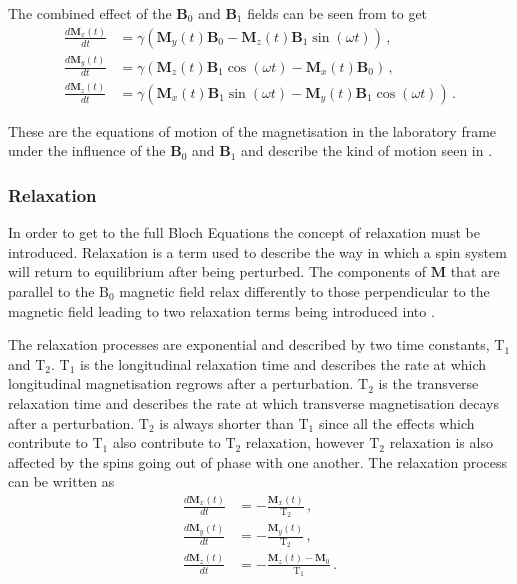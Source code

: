 The combined effect of the $\mathbf{B}_0$ and $\mathbf{B}_1$ fields can be seen from  to get \cite{DeGraaf2007}
\begin{align}
	\frac{d\mathbf{M}_x(t)}{dt} &= \gamma \left(\mathbf{M}_y(t)\mathbf{B}_0 - \mathbf{M}_z(t)\mathbf{B}_1\sin(\omega t)\right)\,,\label{eq:bloch_norelx}\\
	\frac{d\mathbf{M}_y(t)}{dt} &= \gamma \left(\mathbf{M}_z(t)\mathbf{B}_1\cos(\omega t) - \mathbf{M}_x(t)\mathbf{B}_0\right)\,,\label{eq:bloch_norely}\\
	\frac{d\mathbf{M}_z(t)}{dt} &= \gamma \left(\mathbf{M}_x(t)\mathbf{B}_1\sin(\omega t) - \mathbf{M}_y(t)\mathbf{B}_1\cos(\omega t) \right)\,.\label{eq:bloch_norelz}
\end{align}

These are the equations of motion of the magnetisation in the laboratory frame under the influence of the $\mathbf{B}_0$ and $\mathbf{B}_1$ and describe the kind of motion seen in . 

\subsubsection{Relaxation}
In order to get to the full Bloch Equations the concept of relaxation must be introduced. 
Relaxation is a term used to describe the way in which a spin system will return to equilibrium after being perturbed. The components of $\mathbf{M}$ that are parallel to the $\mathrm{B_0}$ magnetic field relax differently to those perpendicular to the magnetic field leading to two relaxation terms being introduced into . 

The relaxation processes are exponential and described by two time constants, $\mathrm{T}_1$ and $\mathrm{T}_2$. $\mathrm{T}_1$ is the longitudinal relaxation time and describes the rate at which longitudinal magnetisation regrows after a perturbation. 
$\mathrm{T}_2$ is the transverse relaxation time and describes the rate at which transverse magnetisation decays after a perturbation. 
$\mathrm{T}_2$ is always shorter than $\mathrm{T}_1$ since all the effects which contribute to $\mathrm{T}_1$ also contribute to $\mathrm{T}_2$ relaxation, however $\mathrm{T}_2$ relaxation is also affected by the spins going out of phase with one another.
The relaxation process can be written as \cite{DeGraaf2007}
\begin{align}
	\frac{d\mathbf{M}_x(t)}{dt} &= -\frac{\mathbf{M}_x(t)}{\mathrm{T}_2}\,,\label{eq:bloch_rel1}\\
	\frac{d\mathbf{M}_y(t)}{dt} &= -\frac{\mathbf{M}_y(t)}{\mathrm{T}_2}\,,\label{eq:bloch_rel2}\\
	\frac{d\mathbf{M}_z(t)}{dt} &= -\frac{\mathbf{M}_z(t) - \mathbf{M}_0}{\mathrm{T}_1}\,.\label{eq:bloch_rel3}
\end{align}
		
